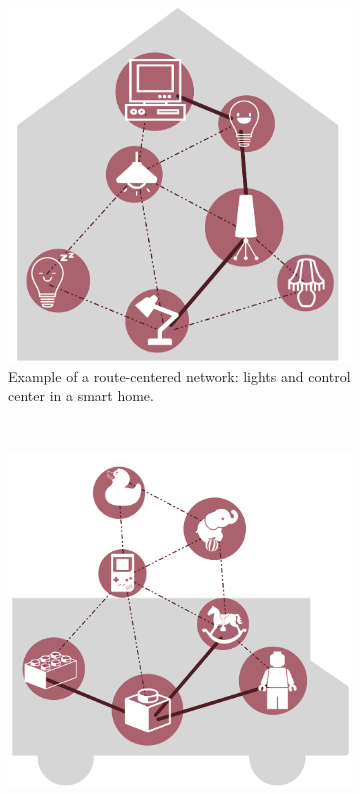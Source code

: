 \documentclass[a4paper,10pt]{scrartcl}
\begin{document}
\begin{figure}
        \centering
        \begin{subfigure}[b]{0.5\textwidth}
                \includegraphics[width=\textwidth]{../images/route_centered_example}
                \caption{Example of a route-centered network: lights and control center in a smart home.}
                \label{fig:rc_img}
        \end{subfigure}%
        ~ %
        \begin{subfigure}[b]{0.5\textwidth}
                \includegraphics[width=\textwidth]{../images/area_centered_example}

\end{subfigure}
\end{figure}
\end{document}
